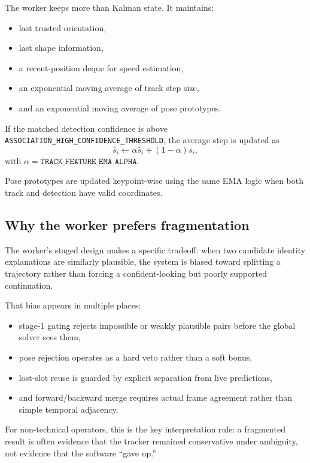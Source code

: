 \documentclass[11pt]{article}
\newcommand{\runtimekey}[1]{\texttt{#1}}
\begin{document}
The worker keeps more than Kalman state. It maintains:

\begin{itemize}
  \item last trusted orientation,
  \item last shape information,
  \item a recent-position deque for speed estimation,
  \item an exponential moving average of track step size,
  \item and an exponential moving average of pose prototypes.
\end{itemize}

If the matched detection confidence is above \runtimekey{ASSOCIATION\_HIGH\_CONFIDENCE\_THRESHOLD}, the average step is updated as
\begin{equation}
  \bar{s}_i \leftarrow
  \alpha \bar{s}_i + (1-\alpha)s_i,
\end{equation}
with $\alpha = \runtimekey{TRACK\_FEATURE\_EMA\_ALPHA}$.

Pose prototypes are updated keypoint-wise using the same EMA logic when both track and detection have valid coordinates.

\subsection{Why the worker prefers fragmentation}

The worker's staged design makes a specific tradeoff: when two candidate identity explanations are similarly plausible, the system is biased toward splitting a trajectory rather than forcing a confident-looking but poorly supported continuation.

That bias appears in multiple places:

\begin{itemize}
  \item stage-1 gating rejects impossible or weakly plausible pairs before the global solver sees them,
  \item pose rejection operates as a hard veto rather than a soft bonus,
  \item lost-slot reuse is guarded by explicit separation from live predictions,
  \item and forward/backward merge requires actual frame agreement rather than simple temporal adjacency.
\end{itemize}

For non-technical operators, this is the key interpretation rule: a fragmented result is often evidence that the tracker remained conservative under ambiguity, not evidence that the software ``gave up.''
\end{document}
